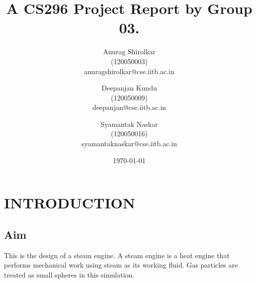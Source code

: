 \documentclass[11pt]{article}
\begin{document}
\title{\textbf{A CS296 Project Report by Group 03.}}
\date{\today}
\author{Anurag Shirolkar \\ (120050003) \\ anuragshirolkar@cse.iitb.ac.in
        \and Deepanjan Kundu \\ (120050009) \\ deepanjan@cse.iitb.ac.in
        \and Syamantak Naskar \\ (120050016) \\ syamantaknaskar@cse.iitb.ac.in}
\maketitle
\clearpage
\tableofcontents
\clearpage
\section{INTRODUCTION}
\subsection{Aim}
This is the design of a steam engine. A steam engine is a heat engine that performs mechanical work using steam as its working fluid. Gas particles are treated as small spheres in this simulation.
\end{document}
